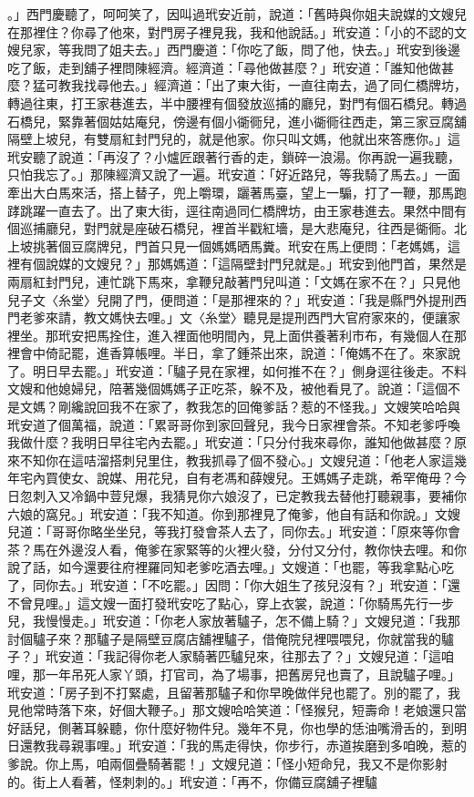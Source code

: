 。」西門慶聽了，呵呵笑了，因叫過玳安近前，說道：「舊時與你姐夫說媒的文嫂兒在那裡住？你尋了他來，對門房子裡見我，我和他說話。」玳安道：「小的不認的文嫂兒家，等我問了姐夫去。」西門慶道：「你吃了飯，問了他，快去。」玳安到後邊吃了飯，走到舖子裡問陳經濟。經濟道：「尋他做甚麼？」玳安道：「誰知他做甚麼？猛可教我找尋他去。」經濟道：「出了東大街，一直往南去，過了同仁橋牌坊，轉過往東，打王家巷進去，半中腰裡有個發放巡捕的廳兒，對門有個石橋兒。轉過石橋兒，緊靠著個姑姑庵兒，傍邊有個小衚衕兒，進小衚衕往西走，第三家豆腐舖隔壁上坡兒，有雙扇紅封門兒的，就是他家。你只叫文媽，他就出來答應你。」這玳安聽了說道：「再沒了？小爐匠跟著行香的走，鎖碎一浪湯。你再說一遍我聽，只怕我忘了。」那陳經濟又說了一遍。玳安道：「好近路兒，等我騎了馬去。」一面牽出大白馬來活，搭上替子，兜上嚼環，躧著馬臺，望上一騸，打了一鞭，那馬跑踍跳躍一直去了。出了東大街，逕往南過同仁橋牌坊，由王家巷進去。果然中間有個巡捕廳兒，對門就是座破石橋兒，裡首半戳紅墻，是大悲庵兒，往西是衚衕。北上坡挑著個豆腐牌兒，門首只見一個媽媽晒馬糞。玳安在馬上便問：「老媽媽，這裡有個說媒的文嫂兒？」那媽媽道：「這隔壁封門兒就是。」玳安到他門首，果然是兩扇紅封門兒，連忙跳下馬來，拿鞭兒敲著門兒叫道：「文媽在家不在？」只見他兒子文〈糸堂〉兒開了門，便問道：「是那裡來的？」玳安道：「我是縣門外提刑西門老爹來請，教文媽快去哩。」文〈糸堂〉聽見是提刑西門大官府家來的，便讓家裡坐。那玳安把馬拴住，進入裡面他明間內，見上面供養著利市布，有幾個人在那裡會中倚記罷，進香算帳哩。半日，拿了鍾茶出來，說道：「俺媽不在了。來家說了。明日早去罷。」玳安道：「驢子見在家裡，如何推不在？」側身逕往後走。不料文嫂和他媳婦兒，陪著幾個媽媽子正吃茶，躲不及，被他看見了。說道：「這個不是文媽？剛纔說回我不在家了，教我怎的回俺爹話？惹的不怪我。」文嫂笑哈哈與玳安道了個萬福，說道：「累哥哥你到家回聲兒，我今日家裡會茶。不知老爹呼喚我做什麼？我明日早往宅內去罷。」玳安道：「只分付我來尋你，誰知他做甚麼？原來不知你在這咭溜搭刺兒里住，教我抓尋了個不發心。」文嫂兒道：「他老人家這幾年宅內買使女、說媒、用花兒，自有老馮和薛嫂兒。王媽媽子走跳，希罕俺毋？今日忽刺入又冷鍋中荳兒爆，我猜見你六娘沒了，已定教我去替他打聽親事，要補你六娘的窩兒。」玳安道：「我不知道。你到那裡見了俺爹，他自有話和你說。」文嫂兒道：「哥哥你略坐坐兒，等我打發會茶人去了，同你去。」玳安道：「原來等你會茶？馬在外邊沒人看，俺爹在家緊等的火裡火發，分付又分付，教你快去哩。和你說了話，如今還要往府裡羅同知老爹吃酒去哩。」文嫂道：「也罷，等我拿點心吃了，同你去。」玳安道：「不吃罷。」因問：「你大姐生了孩兒沒有？」玳安道：「還不曾見哩。」這文嫂一面打發玳安吃了點心，穿上衣裳，說道：「你騎馬先行一步兒，我慢慢走。」玳安道：「你老人家放著驢子，怎不備上騎？」文嫂兒道：「我那討個驢子來？那驢子是隔壁豆腐店舖裡驢子，借俺院兒裡喂喂兒，你就當我的驢子？」玳安道：「我記得你老人家騎著匹驢兒來，往那去了？」文嫂兒道：「這咱哩，那一年吊死人家丫頭，打官司，為了場事，把舊房兒也賣了，且說驢子哩。」玳安道：「房子到不打緊處，且留著那驢子和你早晚做伴兒也罷了。別的罷了，我見他常時落下來，好個大鞭子。」那文嫂哈哈笑道：「怪猴兒，短壽命！老娘還只當好話兒，側著耳躲聽，你什麼好物件兒。幾年不見，你也學的恁油嘴滑舌的，到明日還教我尋親事哩。」玳安道：「我的馬走得快，你步行，赤道挨磨到多咱晚，惹的爹說。你上馬，咱兩個疊騎著罷！」文嫂兒道：「怪小短命兒，我又不是你影射的。街上人看著，怪刺刺的。」玳安道：「再不，你備豆腐舖子裡驢

